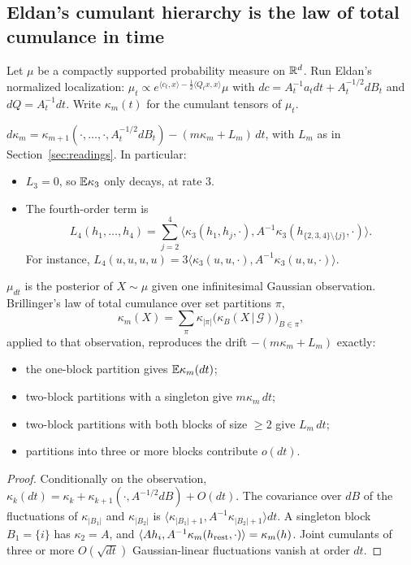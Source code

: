 \label{sec:hierarchy}
\subsection{Eldan's cumulant hierarchy is the law of total cumulance in time}
Let $\mu$ be a compactly supported probability measure on $\mathbb R^d$. Run Eldan's normalized localization: $\mu_t\propto
e^{\langle c_t,x\rangle-\frac12\langle Q_tx,x\rangle}\mu$ with $dc=A_t^{-1}a_tdt+A_t^{-1/2}dB_t$ and $dQ=A_t^{-1}dt$. Write $\kappa_m(t)$ for the
cumulant tensors of $\mu_t$.
\begin{proposition}\label{prop:bkl}
$d\kappa_m=\kappa_{m+1}(\cdot,\dots,\cdot,A_t^{-1/2}dB_t)-(m\kappa_m+L_m)\,dt$, with $L_m$ as in Section~\ref{sec:readings}. In particular:
\begin{itemize}[leftmargin=*]
\item $L_3=0$, so $\mathbb E\kappa_3$ only decays, at rate $3$.
\item The fourth-order term is
\[
L_4(h_1,\dots,h_4)=\sum_{j=2}^4\big\langle\kappa_3(h_1,h_j,\cdot),A^{-1}\kappa_3(h_{\{2,3,4\}\setminus\{j\}},\cdot)\big\rangle .
\]
For instance, $L_4(u,u,u,u)=3\langle\kappa_3(u,u,\cdot),A^{-1}\kappa_3(u,u,\cdot)\rangle$.
\end{itemize}
\end{proposition}
\begin{proposition}\label{prop:totalcum}
$\mu_{dt}$ is the posterior of $X\sim\mu$ given one infinitesimal Gaussian observation. Brillinger's law of total cumulance over
set partitions $\pi$,
\[
\kappa_m(X)=\sum_\pi\kappa_{|\pi|}\big(\kappa_{B}(X\,|\,\mathcal G)\big)_{B\in\pi},
\]
applied to that observation, reproduces the drift $-(m\kappa_m+L_m)$ exactly:
\begin{itemize}[leftmargin=*]
\item the one-block partition gives $\mathbb E\kappa_m(dt)$;
\item two-block partitions with a singleton give $m\kappa_m\,dt$;
\item two-block partitions with both blocks of size $\ge2$ give $L_m\,dt$;
\item partitions into three or more blocks contribute $o(dt)$.
\end{itemize}
\end{proposition}
\begin{proof}
Conditionally on the observation, $\kappa_k(dt)=\kappa_k+\kappa_{k+1}(\cdot,A^{-1/2}dB)+O(dt)$. The covariance over $dB$ of the fluctuations of
$\kappa_{|B_1|}$ and $\kappa_{|B_2|}$ is $\langle\kappa_{|B_1|+1},A^{-1}\kappa_{|B_2|+1}\rangle dt$. A singleton block $B_1=\{i\}$ has $\kappa_2=A$, and
$\langle A h_i,A^{-1}\kappa_m(h_{\rm rest},\cdot)\rangle=\kappa_m(h)$. Joint cumulants of three or more $O(\sqrt{dt})$ Gaussian-linear fluctuations
vanish at order $dt$.
\end{proof}
